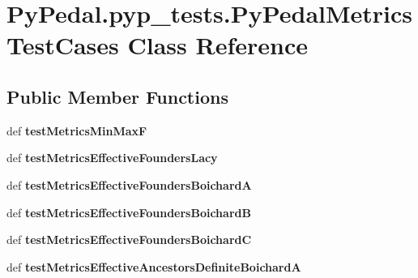 \hypertarget{classPyPedal_1_1pyp__tests_1_1PyPedalMetricsTestCases}{
\section{PyPedal.pyp\_\-tests.PyPedalMetricsTestCases Class Reference}
\label{classPyPedal_1_1pyp__tests_1_1PyPedalMetricsTestCases}
}
\subsection*{Public Member Functions}
\begin{DoxyCompactItemize}
\item 
\hypertarget{classPyPedal_1_1pyp__tests_1_1PyPedalMetricsTestCases_a0da55e3dda83ea2562d232857f588218}{
def {\bfseries testMetricsMinMaxF}}
\label{classPyPedal_1_1pyp__tests_1_1PyPedalMetricsTestCases_a0da55e3dda83ea2562d232857f588218}

\item 
\hypertarget{classPyPedal_1_1pyp__tests_1_1PyPedalMetricsTestCases_a8e8ba012f4c1065b9d3ce84afab5502a}{
def {\bfseries testMetricsEffectiveFoundersLacy}}
\label{classPyPedal_1_1pyp__tests_1_1PyPedalMetricsTestCases_a8e8ba012f4c1065b9d3ce84afab5502a}

\item 
\hypertarget{classPyPedal_1_1pyp__tests_1_1PyPedalMetricsTestCases_ab22c5cb6051cb98beb89f4ba54d1b324}{
def {\bfseries testMetricsEffectiveFoundersBoichardA}}
\label{classPyPedal_1_1pyp__tests_1_1PyPedalMetricsTestCases_ab22c5cb6051cb98beb89f4ba54d1b324}

\item 
\hypertarget{classPyPedal_1_1pyp__tests_1_1PyPedalMetricsTestCases_a7f0242d823cd8a144f5a7b95d0a2b87c}{
def {\bfseries testMetricsEffectiveFoundersBoichardB}}
\label{classPyPedal_1_1pyp__tests_1_1PyPedalMetricsTestCases_a7f0242d823cd8a144f5a7b95d0a2b87c}

\item 
\hypertarget{classPyPedal_1_1pyp__tests_1_1PyPedalMetricsTestCases_ab8dda1759d371601ed336bb0cb2a4e3b}{
def {\bfseries testMetricsEffectiveFoundersBoichardC}}
\label{classPyPedal_1_1pyp__tests_1_1PyPedalMetricsTestCases_ab8dda1759d371601ed336bb0cb2a4e3b}

\item 
\hypertarget{classPyPedal_1_1pyp__tests_1_1PyPedalMetricsTestCases_a9449e30bf7cbb7625283e7faa65de9a8}{
def {\bfseries testMetricsEffectiveAncestorsDefiniteBoichardA}}
\label{classPyPedal_1_1pyp__tests_1_1PyPedalMetricsTestCases_a9449e30bf7cbb7625283e7faa65de9a8}


\end{DoxyCompactItemize}
